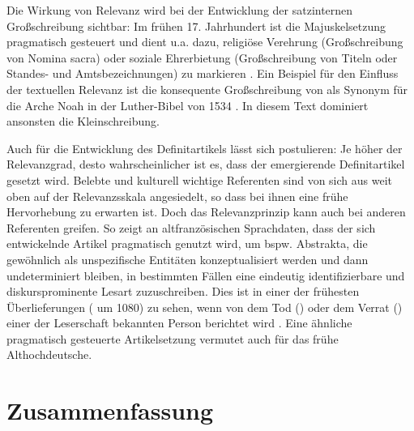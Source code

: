 Die Wirkung von Relevanz wird bei der Entwicklung der satzinternen Großschreibung sichtbar: Im frühen 17. Jahrhundert ist die Majuskelsetzung pragmatisch gesteuert und dient u.a. dazu, religiöse Verehrung (Großschreibung von Nomina sacra) oder soziale Ehrerbietung  (Großschreibung von Titeln oder Standes- und Amtsbezeichnungen) zu markieren \parencite[73]{Bergmann1999}. Ein Beispiel für den Einfluss der textuellen Relevanz ist die konsequente Großschreibung von  als Synonym für die Arche Noah in der Luther-Bibel von 1534 \parencite[352]{Szczepaniak2011}. In diesem Text dominiert ansonsten die Kleinschreibung.

Auch für die Entwicklung des Definitartikels lässt sich postulieren: Je höher der Relevanzgrad, desto wahrscheinlicher ist es, dass der emergierende Definitartikel gesetzt wird. Belebte und kulturell wichtige Referenten sind von sich aus weit oben auf der Relevanzsskala angesiedelt, so dass bei ihnen eine frühe Hervorhebung zu erwarten ist. 
Doch das Relevanzprinzip kann auch bei anderen Referenten greifen. So zeigt \textcite[]{Epstein1993,Epstein1994} an altfranzösischen Sprachdaten, dass der sich entwickelnde Artikel pragmatisch genutzt wird, um bspw. Abstrakta, die gewöhnlich als unspezifische Entitäten konzeptualisiert werden und dann undeterminiert bleiben, in bestimmten Fällen eine eindeutig identifizierbare und diskursprominente Lesart zuzuschreiben. Dies ist in einer der frühesten Überlieferungen  ( um 1080) zu sehen, wenn von dem Tod () oder dem Verrat () einer der Leserschaft bekannten Person berichtet wird \parencite[71--72]{Epstein1994}. Eine ähnliche pragmatisch gesteuerte Artikelsetzung vermutet auch \textcite[218]{Oubouzar1989} für das frühe Althochdeutsche. 

\section{Zusammenfassung} \label{sec:bel-zusammenfassung}


